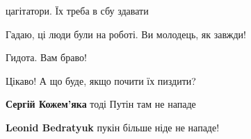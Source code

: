 \begin{itemize}
\begin{itemize}
 
цагітатори. Їх треба в сбу здавати
\end{itemize}

 
Гадаю, ці люди були на роботі. Ви молодець, як завжди!

 
Гидота. Вам браво!

 
Цікаво! А що буде, якщо почити їх пиздити?

\begin{itemize}
 
\textbf{Сергій Кожем'яка} тоді Путін там не нападе

 
\textbf{Leonid Bedratyuk} пукін більше ніде не нападе!
\end{itemize}

 

\end{itemize}
